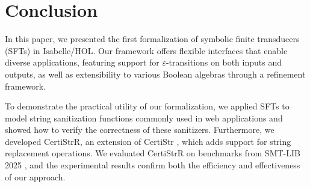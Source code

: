 \section{Conclusion}
\label{sec:conclusion}

In this paper, we presented the first formalization of symbolic finite transducers (SFTs) in Isabelle/HOL. Our framework offers flexible interfaces that enable diverse applications, featuring support for $\varepsilon$-transitions on both inputs and outputs, as well as extensibility to various Boolean algebras through a refinement framework.

To demonstrate the practical utility of our formalization, we applied SFTs to model string sanitization functions commonly used in web applications and showed how to verify the correctness of these sanitizers. Furthermore, we developed CertiStrR, an extension of CertiStr \cite{cpp/KanLRS22}, which adds support for string replacement operations. We evaluated CertiStrR on benchmarks from SMT-LIB 2025 \cite{smtlib_benchmarks}, and the experimental results confirm both the efficiency and effectiveness of our approach.

